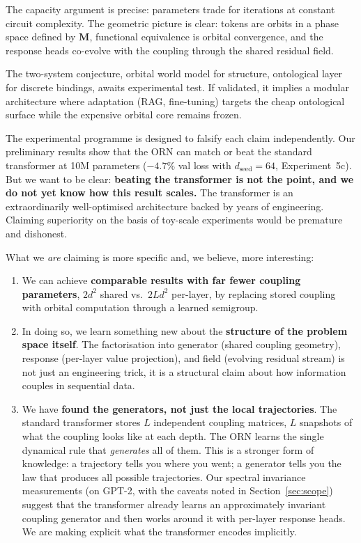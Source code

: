 \documentclass[11pt, a4paper]{article}
\newcommand{\M}{\mathbf{M}}
\theoremstyle{remark}
\begin{document}
The capacity argument is precise: parameters trade for iterations at constant circuit complexity.
The geometric picture is clear: tokens are orbits in a phase space defined by $\M$, functional equivalence is orbital convergence, and the response heads co-evolve with the coupling through the shared residual field.

The two-system conjecture, orbital world model for structure, ontological layer for discrete bindings, awaits experimental test.
If validated, it implies a modular architecture where adaptation (RAG, fine-tuning) targets the cheap ontological surface while the expensive orbital core remains frozen.

The experimental programme is designed to falsify each claim independently.
Our preliminary results show that the ORN can match or beat the standard transformer at 10M parameters ($-4.7\%$ val loss with $d_{\text{seed}} = 64$, Experiment~5c).
But we want to be clear: \textbf{beating the transformer is not the point, and we do not yet know how this result scales.}
The transformer is an extraordinarily well-optimised architecture backed by years of engineering.
Claiming superiority on the basis of toy-scale experiments would be premature and dishonest.

What we \emph{are} claiming is more specific and, we believe, more interesting:
\begin{enumerate}[nosep]
    \item We can achieve \textbf{comparable results with far fewer coupling parameters}, $2d^2$ shared vs.\ $2Ld^2$ per-layer, by replacing stored coupling with orbital computation through a learned semigroup.
    \item In doing so, we learn something new about the \textbf{structure of the problem space itself}.
    The factorisation into generator (shared coupling geometry), response (per-layer value projection), and field (evolving residual stream) is not just an engineering trick, it is a structural claim about how information couples in sequential data.
    \item We have \textbf{found the generators, not just the local trajectories}.
    The standard transformer stores $L$ independent coupling matrices, $L$ snapshots of what the coupling looks like at each depth.
    The ORN learns the single dynamical rule that \emph{generates} all of them.
    This is a stronger form of knowledge: a trajectory tells you where you went; a generator tells you the law that produces all possible trajectories.
    Our spectral invariance measurements (on GPT-2, with the caveats noted in Section~\ref{sec:scope}) suggest that the transformer already learns an approximately invariant coupling generator and then works around it with per-layer response heads.
    We are making explicit what the transformer encodes implicitly.
\end{enumerate}
\end{document}
